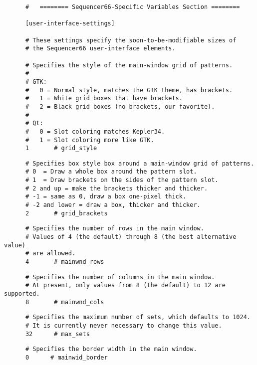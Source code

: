    \begin{verbatim}
      #   ======== Sequencer66-Specific Variables Section ========

      [user-interface-settings]

      # These settings specify the soon-to-be-modifiable sizes of
      # the Sequencer66 user-interface elements.

      # Specifies the style of the main-window grid of patterns.
      #
      # GTK:
      #   0 = Normal style, matches the GTK theme, has brackets.
      #   1 = White grid boxes that have brackets.
      #   2 = Black grid boxes (no brackets, our favorite).
      #
      # Qt:
      #   0 = Slot coloring matches Kepler34.
      #   1 = Slot coloring more like GTK.
      1       # grid_style
   \end{verbatim}

   \begin{verbatim}
      # Specifies box style box around a main-window grid of patterns.
      # 0  = Draw a whole box around the pattern slot.
      # 1  = Draw brackets on the sides of the pattern slot.
      # 2 and up = make the brackets thicker and thicker.
      # -1 = same as 0, draw a box one-pixel thick.
      # -2 and lower = draw a box, thicker and thicker.
      2       # grid_brackets
   \end{verbatim}

   \begin{verbatim}
      # Specifies the number of rows in the main window.
      # Values of 4 (the default) through 8 (the best alternative value)
      # are allowed.
      4       # mainwnd_rows
   \end{verbatim}

   \begin{verbatim}
      # Specifies the number of columns in the main window.
      # At present, only values from 8 (the default) to 12 are supported.
      8       # mainwnd_cols
   \end{verbatim}

   \begin{verbatim}
      # Specifies the maximum number of sets, which defaults to 1024.
      # It is currently never necessary to change this value.
      32      # max_sets
   \end{verbatim}

   \begin{verbatim}
      # Specifies the border width in the main window.
      0      # mainwid_border
   \end{verbatim}

